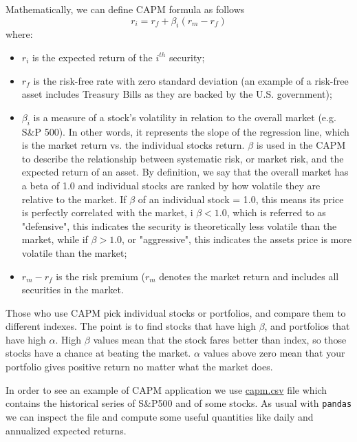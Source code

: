 Mathematically, we can define CAPM formula as follows
\begin{equation}
r_i = r_f + \beta_i(r_m-r_f)
\label{eq:capm}
\end{equation}
where:
\begin{itemize}
	\item $r_i$ is the expected return of the $i^{th}$ security;
	\item $r_f$ is the risk-free rate with zero standard deviation (an example of a risk-free asset includes Treasury Bills as they are backed by the U.S. government);
	\item $\beta_i$ is a measure of a stock's volatility in relation to the overall market (e.g. S\&P 500). In other words, it represents the slope of the regression line, which is the market return vs. the individual stocks return. $\beta$ is used in the CAPM to describe the relationship between systematic risk, or market risk, and the expected return of an asset. By definition, we say that the overall market has a beta of 1.0 and individual stocks are ranked by how volatile they are relative to the market. If $\beta$ of an individual stock = 1.0, this means its price is perfectly correlated with the market, i $\beta < 1.0$, which is referred to as "defensive", this indicates the security is theoretically less volatile than the market, while if $\beta > 1.0$, or "aggressive", this indicates the assets price is more volatile than the market;
	\item $r_m - r_f$ is the risk premium ($r_m$ denotes the market return and includes all securities in the market.
\end{itemize}

Those who use CAPM pick individual stocks or portfolios, and compare them to different indexes. The point is to find stocks that have high $\beta$, and portfolios that have high $\alpha$. High $\beta$ values mean that the stock fares better than index, so those stocks have a chance at beating the market. $\alpha$ values above zero mean that your portfolio gives positive return no matter what the market does.

In order to see an example of CAPM application we use \href{https://drive.google.com/file/d/1G4U8foyhq9agGPs8cg83-aY4qU8K3jJI/view?usp=sharing}{capm.csv} file which contains the historical series of S\&P500 and of some stocks.
As usual with \texttt{pandas} we can inspect the file and compute some useful quantities like daily and annualized expected returns.

